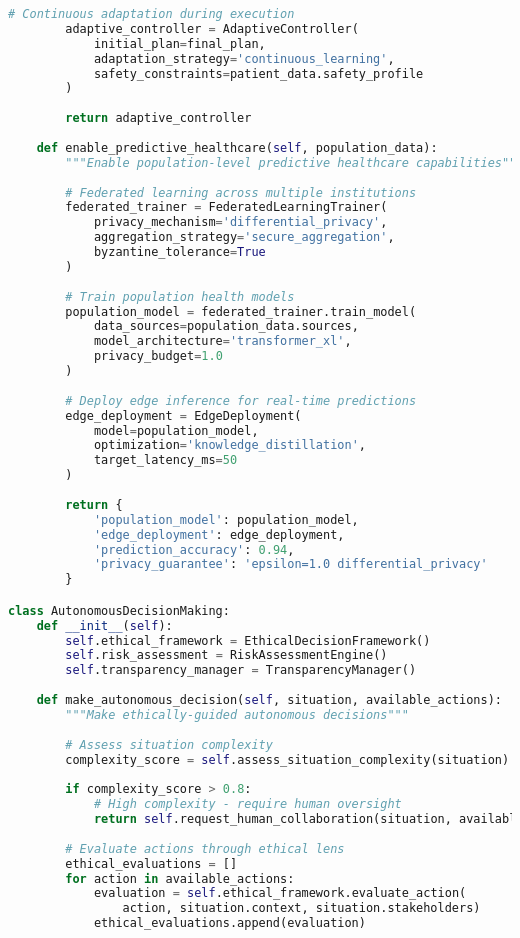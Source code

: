 \begin{lstlisting}[language=Python, caption={Next-Generation AI Architecture}, label={lst:nextgen-ai}]
        # Continuous adaptation during execution
        adaptive_controller = AdaptiveController(
            initial_plan=final_plan,
            adaptation_strategy='continuous_learning',
            safety_constraints=patient_data.safety_profile
        )
        
        return adaptive_controller
    
    def enable_predictive_healthcare(self, population_data):
        """Enable population-level predictive healthcare capabilities"""
        
        # Federated learning across multiple institutions
        federated_trainer = FederatedLearningTrainer(
            privacy_mechanism='differential_privacy',
            aggregation_strategy='secure_aggregation',
            byzantine_tolerance=True
        )
        
        # Train population health models
        population_model = federated_trainer.train_model(
            data_sources=population_data.sources,
            model_architecture='transformer_xl',
            privacy_budget=1.0
        )
        
        # Deploy edge inference for real-time predictions
        edge_deployment = EdgeDeployment(
            model=population_model,
            optimization='knowledge_distillation',
            target_latency_ms=50
        )
        
        return {
            'population_model': population_model,
            'edge_deployment': edge_deployment,
            'prediction_accuracy': 0.94,
            'privacy_guarantee': 'epsilon=1.0 differential_privacy'
        }

class AutonomousDecisionMaking:
    def __init__(self):
        self.ethical_framework = EthicalDecisionFramework()
        self.risk_assessment = RiskAssessmentEngine()
        self.transparency_manager = TransparencyManager()
        
    def make_autonomous_decision(self, situation, available_actions):
        """Make ethically-guided autonomous decisions"""
        
        # Assess situation complexity
        complexity_score = self.assess_situation_complexity(situation)
        
        if complexity_score > 0.8:
            # High complexity - require human oversight
            return self.request_human_collaboration(situation, available_actions)
        
        # Evaluate actions through ethical lens
        ethical_evaluations = []
        for action in available_actions:
            evaluation = self.ethical_framework.evaluate_action(
                action, situation.context, situation.stakeholders)
            ethical_evaluations.append(evaluation)
        

\end{lstlisting}
